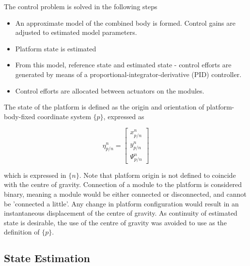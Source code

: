 The control problem is solved in the following steps
\begin{itemize}
	\item An approximate model of the combined body is formed. Control gains are adjusted to estimated model parameters. 
	\item Platform state is estimated
	\item From this model, reference state and estimated state - control efforts are generated by means of a proportional-integrator-derivative (PID) controller.
	\item Control efforts are allocated between actuators on the modules. 
\end{itemize}

The state of the platform is defined as the origin and orientation of platform-body-fixed coordinate system $\{p\}$, expressed as 

\begin{equation}
\eta_{p/n}^{n} = \begin{bmatrix} x_{p/n}^{n}\\ y_{p/n}^{n} \\ \Psi_{p/n}^{n} \end{bmatrix}
\end{equation}

which is expressed in $\{n\}$. Note that platform origin is not defined to coincide with the centre of gravity. Connection of a module to the platform is considered binary, meaning a module would be either connected or disconnected, and cannot be 'connected a little'. Any change in platform configuration would result in an instantaneous displacement of the centre of gravity. As continuity of estimated state is desirable, the use of the centre of gravity was avoided to use as the definition of $\{p\}$.




\subsection{State Estimation}
\label{sec:stateEstimationDesign}

